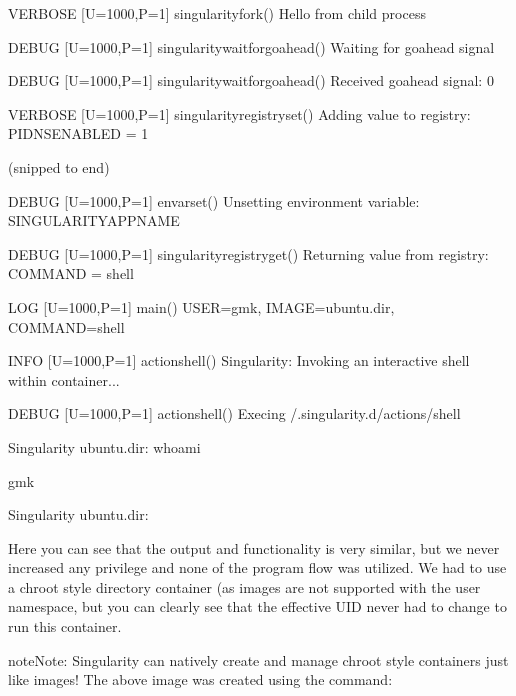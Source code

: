 \documentclass[letterpaper,10pt,english]{sphinxmanual}
\begin{document}
\begin{sphinxVerbatim}[commandchars=\\\{\}]
VERBOSE [U=1000,P=1]       singularity\PYGZus{}fork()                        Hello from child process

DEBUG   [U=1000,P=1]       singularity\PYGZus{}wait\PYGZus{}for\PYGZus{}go\PYGZus{}ahead()           Waiting for go\PYGZhy{}ahead signal

DEBUG   [U=1000,P=1]       singularity\PYGZus{}wait\PYGZus{}for\PYGZus{}go\PYGZus{}ahead()           Received go\PYGZhy{}ahead signal: 0

VERBOSE [U=1000,P=1]       singularity\PYGZus{}registry\PYGZus{}set()                Adding value to registry: \PYGZsq{}PIDNS\PYGZus{}ENABLED\PYGZsq{} = \PYGZsq{}1\PYGZsq{}
\end{sphinxVerbatim}

(snipped to end)

%
\begin{sphinxVerbatim}[commandchars=\\\{\}]
DEBUG   [U=1000,P=1]       envar\PYGZus{}set()                               Unsetting environment variable: SINGULARITY\PYGZus{}APPNAME

DEBUG   [U=1000,P=1]       singularity\PYGZus{}registry\PYGZus{}get()                Returning value from registry: \PYGZsq{}COMMAND\PYGZsq{} = \PYGZsq{}shell\PYGZsq{}

LOG     [U=1000,P=1]       main()                                    USER=gmk, IMAGE=\PYGZsq{}ubuntu.dir\PYGZsq{}, COMMAND=\PYGZsq{}shell\PYGZsq{}

INFO    [U=1000,P=1]       action\PYGZus{}shell()                            Singularity: Invoking an interactive shell within container...


DEBUG   [U=1000,P=1]       action\PYGZus{}shell()                            Exec\PYGZsq{}ing /.singularity.d/actions/shell

Singularity ubuntu.dir:\PYGZti{}\PYGZgt{} whoami

gmk

Singularity ubuntu.dir:\PYGZti{}\PYGZgt{}
\end{sphinxVerbatim}

Here you can see that the output and functionality is very similar,
but we never increased any privilege and none of the  program flow was
utilized. We had to use a chroot style directory container (as images
are not supported with the user namespace, but you can clearly see
that the effective UID never had to change to run this container.

\begin{sphinxadmonition}{note}{Note:}
Singularity can natively create and manage chroot style
containers just like images! The above image was created using the
command: 
\end{sphinxadmonition}
\end{document}
